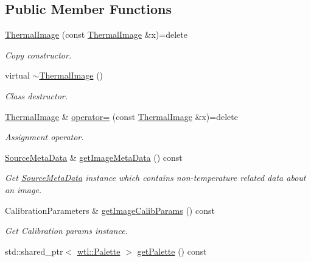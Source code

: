 \subsection*{Public Member Functions}
\begin{DoxyCompactItemize}
\item 
\hyperlink{classwtl_1_1_thermal_image_ad50c00450d49151999b2cefadafc1b70}{Thermal\+Image} (const \hyperlink{classwtl_1_1_thermal_image}{Thermal\+Image} \&x)=delete
\begin{DoxyCompactList}\small\item\em Copy constructor. \end{DoxyCompactList}\item 
virtual \hyperlink{classwtl_1_1_thermal_image_a7afe55e31e0bc111a18a227cff611a35}{$\sim$\+Thermal\+Image} ()
\begin{DoxyCompactList}\small\item\em Class destructor. \end{DoxyCompactList}\item 
\hyperlink{classwtl_1_1_thermal_image}{Thermal\+Image} \& \hyperlink{classwtl_1_1_thermal_image_ac411b17ea86fd39c3737c7d9096e371c}{operator=} (const \hyperlink{classwtl_1_1_thermal_image}{Thermal\+Image} \&x)=delete
\begin{DoxyCompactList}\small\item\em Assignment operator. \end{DoxyCompactList}\item 
\hyperlink{classwtl_1_1_source_meta_data}{Source\+Meta\+Data} \& \hyperlink{classwtl_1_1_thermal_image_a3bcccd7e0d37bfb0656ec8a076379224}{get\+Image\+Meta\+Data} () const
\begin{DoxyCompactList}\small\item\em Get \hyperlink{classwtl_1_1_source_meta_data}{Source\+Meta\+Data} instance which contains non-\/temperature related data about an image. \end{DoxyCompactList}\item 
Calibration\+Parameters \& \hyperlink{classwtl_1_1_thermal_image_ad230e96412b38701538cf424074cd3e1}{get\+Image\+Calib\+Params} () const
\begin{DoxyCompactList}\small\item\em Get Calibration params instance. \end{DoxyCompactList}\item 
std\+::shared\+\_\+ptr$<$ \hyperlink{classwtl_1_1_palette}{wtl\+::\+Palette} $>$ \hyperlink{classwtl_1_1_thermal_image_a87ec0327e8fa2281caefb4ff3f67e42f}{get\+Palette} () const

\end{DoxyCompactItemize}
